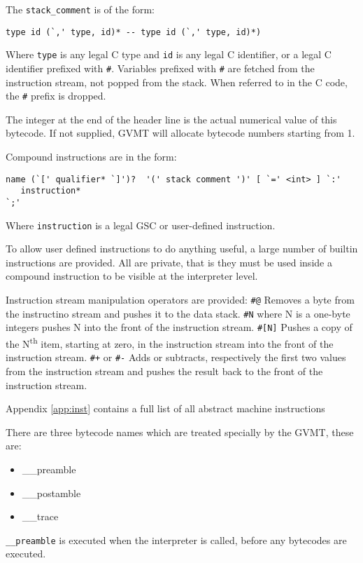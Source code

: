 The \verb|stack_comment| is of the form:
 \begin{verbatim}
type id (`,' type, id)* -- type id (`,' type, id)*)
\end{verbatim}

Where \verb|type| is any legal C type and \verb|id| is any legal C identifier, or a legal C identifier prefixed with \verb|#|. Variables prefixed with \verb|#| are fetched from the instruction stream, not popped from the stack. When referred to in the C code, the \verb|#| prefix is dropped.

The integer at the end of the header line is the actual numerical value of this bytecode. If not supplied, GVMT will allocate bytecode numbers starting from 1.

Compound instructions are in the form:
\begin{verbatim}
name (`[' qualifier* `]')?  '(' stack comment ')' [ `=' <int> ] `:'
   instruction*
`;'
\end{verbatim}

Where \verb|instruction| is a legal GSC or user-defined instruction.

To allow user defined instructions to do anything useful, a large number of builtin instructions are provided. All are private, that is they must be used inside a compound instruction to be visible at the interpreter level. 

Instruction stream manipulation operators are provided:
\verb|#@| Removes a byte from the instructino stream and pushes it to the data stack.
\verb|#N| where N is a one-byte integers pushes N into the front of the instruction stream.
\verb|#[N]| Pushes a copy of the N\textsuperscript{th} item, starting at zero, in the instruction stream into the front of the instruction stream.
\verb|#+| or \verb|#-| Adds or subtracts, respectively the first two values from the instruction stream  and pushes the result back to the front of the instruction stream.

Appendix \ref{app:inst} contains a full list of all abstract machine instructions 

There are three bytecode names which are treated specially by the GVMT, these are:
\begin{itemize}
\item \_\_preamble 
\item \_\_postamble
\item \_\_trace
\end{itemize}
\verb|__preamble| is executed when the interpreter is called, before any bytecodes are executed.

